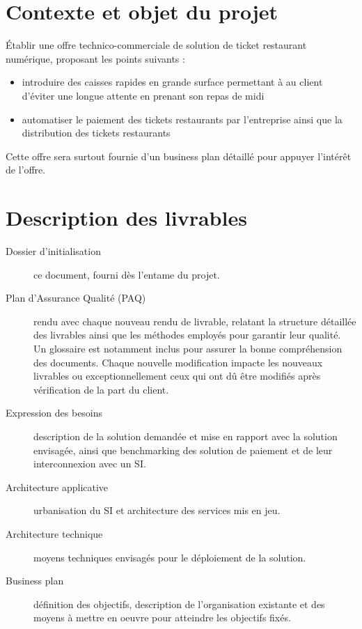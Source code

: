 




\section{Contexte et objet du projet} %
Établir une offre technico-commerciale de solution de ticket restaurant
numérique, proposant les points suivants :
\begin{itemize}
  \item introduire des caisses rapides en grande surface permettant à au client
    d'éviter une longue attente en prenant son repas de midi
  \item automatiser le paiement des tickets restaurants par l'entreprise ainsi
    que la distribution des tickets restaurants
\end{itemize}

Cette offre sera surtout fournie d'un business plan détaillé pour appuyer
l'intérêt de l'offre. \\

\section{Description des livrables}
\begin{description}
    \item[Dossier d'initialisation] ce document, fourni dès l'entame du projet.
    \item[Plan d'Assurance Qualité (PAQ)] rendu avec chaque nouveau rendu de
        livrable, relatant la structure détaillée des livrables ainsi que les
        méthodes employés pour garantir leur qualité. Un glossaire est
        notamment inclus pour assurer la bonne compréhension des documents.
        Chaque nouvelle modification impacte les nouveaux livrables ou
        exceptionnellement ceux qui ont dû être modifiés après vérification de
        la part du client.
    \item[Expression des besoins] description de la solution demandée et mise en
        rapport avec la solution envisagée, ainsi que benchmarking des solution
        de paiement et de leur interconnexion avec un SI.
    \item[Architecture applicative] urbanisation du SI et architecture des services mis en jeu.
    \item[Architecture technique] moyens techniques envisagés pour le déploiement de la solution.
    \item[Business plan] définition des objectifs, description de l'organisation
        existante et des moyens à mettre en oeuvre pour atteindre les objectifs
        fixés.
\end{description}

